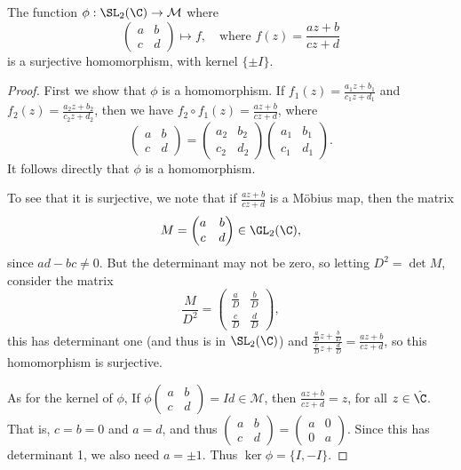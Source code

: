 \documentclass[a4]{scrreprt}
\begin{document}
\begin{proposition}
	The function $\phi : \SL_2(\C) \rightarrow \mathcal{M}$ where 
	$$
		\begin{pmatrix}
			a & b \\ c & d
		\end{pmatrix} \longmapsto f, \quad \text{where } f(z) = \frac{az + b}{cz + d} 
	$$
	is a surjective homomorphism, with kernel $\{\pm I\}$.
\end{proposition}
\begin{proof}
	First we show that $\phi$ is a homomorphism. If $f_1(z) = \frac{a_1 z + b_1}{c_1 z + d_1}$ and $f_2(z) = \frac{a_2 z + b_2}{c_2 z + d_2}$, then we have $f_2 \circ f_1(z) = \frac{az + b}{cz + d}$, where
	$$
	\begin{pmatrix}
		a & b \\
		c & d
		\end{pmatrix}=\begin{pmatrix}
		a_{2} & b_{2} \\
		c_2 & d_{2}
		\end{pmatrix}\begin{pmatrix}
		a_{1} & b_{1} \\
		c_{1} & d_{1}
		\end{pmatrix}.
	$$
	It follows directly that $\phi$ is a homomorphism.

	To see that it is surjective, we note that if $\frac{az + b}{cz + d}$ is a Möbius map, then the matrix
	$$
	M = \begin{pmatrix}
		a & b \\
		c & d
		\end{pmatrix} \in \GL_2(\C),
	$$
	since $ad - bc \neq 0$. But the determinant may not be zero, so letting $D^2= \det M$, consider the matrix
	$$
	\frac{M}{D^2} = \begin{pmatrix}
		\frac{a}{D} & \frac{b}{D} \\
		\frac{c}{D} & \frac{d}{D}
		\end{pmatrix},
	$$
	this has determinant one (and thus is in $\SL_2(\C)$) and $\frac{\frac{a}{D}z + \frac{b}{D}}{\frac{c}{D}z + \frac{d}{D}} = \frac{az + b}{cz + d}$, so this homomorphism is surjective.

	As for the kernel of $\phi$, If $\phi\begin{pmatrix}
		a & b \\ c & d
	\end{pmatrix} = Id \in \mathcal{M}$, then $\frac{az + b}{cz + d} = z$, for all $z \in \hat{\C}$. That is, $c = b = 0$ and $a = d$, and thus $\begin{pmatrix}
		a & b \\ c & d
	\end{pmatrix} = \begin{pmatrix}
		a & 0 \\ 0 & a
	\end{pmatrix}$. Since this has determinant 1, we also need $a = \pm  1$. Thus $\ker \phi = \{I, -I\}$.
\end{proof}
\end{document}

